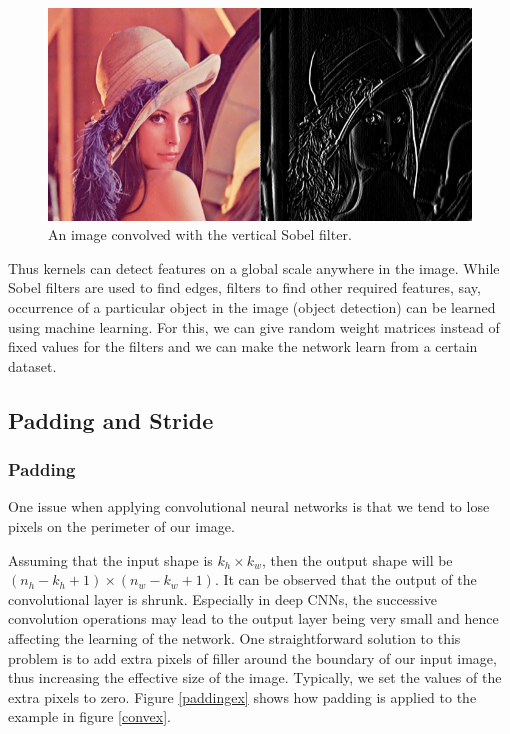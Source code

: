 \documentclass[11pt]{report}
\begin{document}
\begin{figure}[!h]
	\includegraphics[scale=0.4]{filter.png}
	\centering 
	\caption{An image convolved with the vertical Sobel filter.}
	\label{kernalex}
\end{figure}
\vspace{7pt}
Thus kernels can detect features on a global scale anywhere in the image. While Sobel filters are used to find edges, filters to find other required features, say, occurrence of a particular object in the image (object detection) can be learned using machine learning. For this, we can give random weight matrices instead of fixed values for the filters and we can make the network learn from a certain dataset.

\subsection{Padding and Stride}
\subsubsection{Padding}
One issue when applying convolutional neural networks is that we tend to lose pixels on the perimeter of our image.

Assuming that the input shape is $k_h \times k_w$, then the output shape will be $(n_h - k_h + 1)\times(n_w - k_w +1)$.
It can be observed that the output of the convolutional layer is shrunk. Especially in deep CNNs, the successive convolution operations may lead to the output layer being very small and hence affecting the learning of the network.  One straightforward solution to this problem is to add extra pixels of filler around the boundary of our input image, thus increasing the effective size of the image. Typically, we set the values of the extra pixels to zero. Figure \ref{paddingex} shows how padding is applied to the example in figure \ref{convex}.
\end{document}
